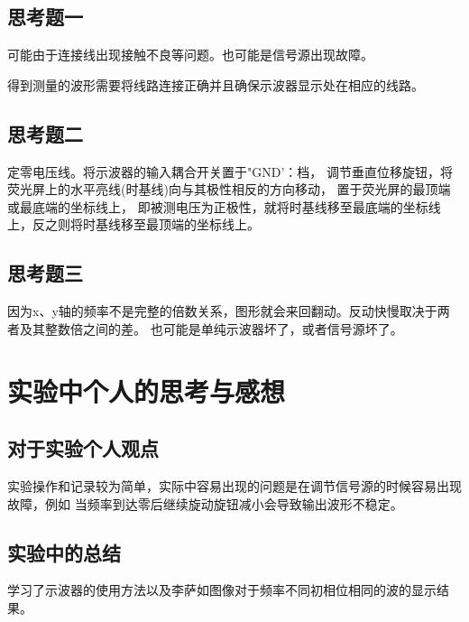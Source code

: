 \documentclass{ctexart}
\begin{document}
  \subsection{思考题一}
  可能由于连接线出现接触不良等问题。也可能是信号源出现故障。

  得到测量的波形需要将线路连接正确并且确保示波器显示处在相应的线路。

  \subsection{思考题二}
  定零电压线。将示波器的输入耦合开关置于"GND'：档，
  调节垂直位移旋钮，将荧光屏上的水平亮线(时基线)向与其极性相反的方向移动，
  置于荧光屏的最顶端或最底端的坐标线上，
  即被测电压为正极性，就将时基线移至最底端的坐标线上，反之则将时基线移至最顶端的坐标线上。

  \subsection{思考题三}
  因为x、y轴的频率不是完整的倍数关系，图形就会来回翻动。反动快慢取决于两者及其整数倍之间的差。
  也可能是单纯示波器坏了，或者信号源坏了。

\section{实验中个人的思考与感想}
  \subsection{对于实验个人观点}
  实验操作和记录较为简单，实际中容易出现的问题是在调节信号源的时候容易出现故障，例如
  当频率到达零后继续旋动旋钮减小会导致输出波形不稳定。

  \subsection{实验中的总结}
  学习了示波器的使用方法以及李萨如图像对于频率不同初相位相同的波的显示结果。
\end{document}
